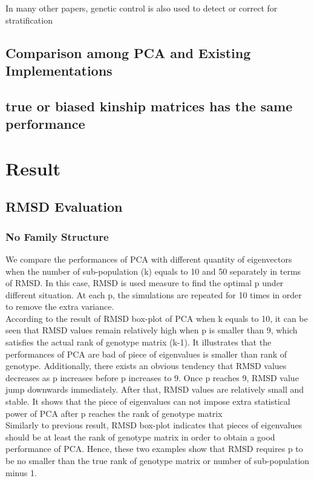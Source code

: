 \documentclass[12pt]{article}
\theoremstyle{definition}
\theoremstyle{plain}
\begin{document}
In many other papers, genetic control is also used to detect or correct for stratification



\subsection{Comparison among PCA and Existing Implementations }


\subsection{true or biased kinship matrices has the same performance}



\section{Result}
\subsection{RMSD Evaluation}
\subsubsection{No Family Structure}
We compare the performances of PCA with different quantity of eigenvectors when the number of sub-population (k) equals to 10 and 50 separately in terms of RMSD. In this case,  RMSD is used measure to find the optimal p under different situation. At each p, the simulations are repeated for 10 times in order to remove the extra variance.\\

According to the result of RMSD box-plot of PCA when k equals to 10, it can be seen that RMSD values remain relatively high when p is smaller than 9, which satisfies the actual rank of genotype matrix (k-1). It illustrates that the performances of PCA are bad of piece of eigenvalues is smaller than rank of genotype. Additionally, there exists an obvious tendency that RMSD values decreases as p increases before p increases to 9. Once p reaches 9, RMSD value jump downwards immediately. After that, RMSD values are relatively small and stable. It shows that the piece of eigenvalues can not impose extra statistical power of PCA after p reaches the rank of genotype matrix\\

Similarly to previous result, RMSD box-plot indicates that pieces of eigenvalues should be at least the rank of genotype matrix in order to obtain a good performance of PCA. Hence, these two examples show that RMSD requires p to be no smaller than the true rank of genotype matrix or number of sub-population minus 1.
\end{document}
